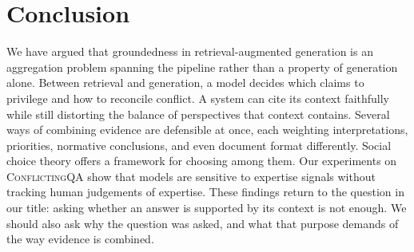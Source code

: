 \section{Conclusion}
\label{sec:conclusion}

We have argued that groundedness in retrieval-augmented generation is an aggregation problem spanning the pipeline rather than a property of generation alone. Between retrieval and generation, a model decides which claims to privilege and how to reconcile conflict. A system can cite its context faithfully while still distorting the balance of perspectives that context contains. Several ways of combining evidence are defensible at once, each weighting interpretations, priorities, normative conclusions, and even document format differently. Social choice theory offers a framework for choosing among them. Our experiments on \textsc{ConflictingQA} show that models are sensitive to expertise signals without tracking human judgements of expertise. These findings return to the question in our title: asking whether an answer is supported by its context is not enough. We should also ask why the question was asked, and what that purpose demands of the way evidence is combined.
